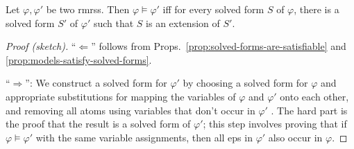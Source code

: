 \begin{prop}\label{thm:big-one}
  Let $\varphi, \varphi'$ be two {\sc rmrs}s.  Then $\varphi \models
  \varphi'$ iff for every solved form $S$ of $\varphi$, there is a
  solved form $S'$ of $\varphi'$ such that $S$ is an extension of
  $S'$. 
\end{prop}
\begin{proof}[Proof (sketch)]
``$\Leftarrow$'' follows from
Props.~\ref{prop:solved-forms-are-satisfiable} and
\ref{prop:models-satisfy-solved-forms}.

``$\Rightarrow$'': We construct a solved form for
$\varphi'$ by choosing a solved form for $\varphi$ and appropriate
substitutions for mapping the variables of $\varphi$ and $\varphi'$
onto each other, and removing all atoms using variables that don't
occur in $\varphi'$ .  The hard part is the proof that the result is a
solved form of $\varphi'$; this step involves proving that if $\varphi
\models \varphi'$ with the same variable assignments, then all {\sc
  ep}s in $\varphi'$ also occur in $\varphi$.
\end{proof}

